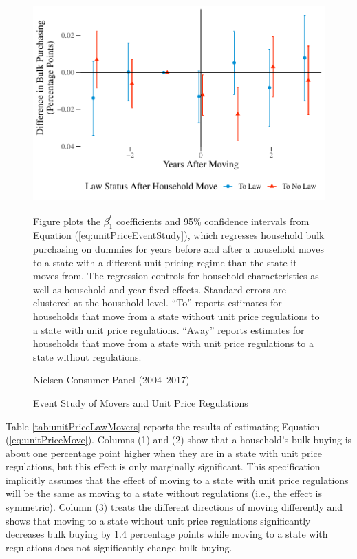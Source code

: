 \documentclass[AER]{AEA_mal}
\begin{document}
\begin{figure}[!htb]
\centering
\caption{Event Study of Movers and Unit Price Regulations}
\includegraphics[width = 5in, height = 3in]{../5_figures/unitPriceEventStudyColor.pdf}
\begin{figurenotes}
Figure plots the $\beta_1^t$ coefficients and 95\% confidence intervals from Equation (\ref{eq:unitPriceEventStudy}), which regresses household bulk purchasing on dummies for years before and after a household moves to a state with a different unit pricing regime than the state it moves from. The regression controls for household characteristics as well as household and year fixed effects. Standard errors are clustered at the household level. ``To'' reports estimates for households that move from a state without unit price regulations to a state with unit price regulations. ``Away'' reports estimates for households that move from a state with unit price regulations to a state without regulations.
\end{figurenotes}
\begin{figurenotes}[Source]
Nielsen Consumer Panel (2004--2017)
\end{figurenotes}
\label{fig:unitPriceEventStudy}
\end{figure}

Table \ref{tab:unitPriceLawMovers} reports the results of estimating Equation (\ref{eq:unitPriceMove}). Columns (1) and (2) show that a household's bulk buying is about one percentage point higher when they are in a state with unit price regulations, but this effect is only marginally significant. This specification implicitly assumes that the effect of moving to a state with unit price regulations will be the same as moving to a state without regulations (i.e., the effect is symmetric). Column (3) treats the different directions of moving differently and shows that moving to a state without unit price regulations significantly decreases bulk buying by 1.4 percentage points while moving to a state with regulations does not significantly change bulk buying.
\end{document}
